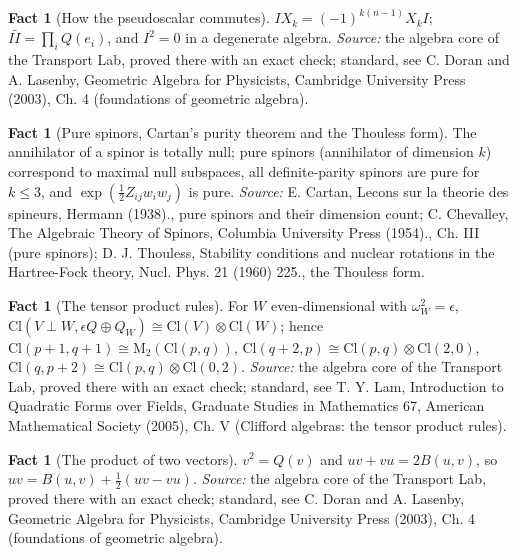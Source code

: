 \documentclass[11pt]{article}
\theoremstyle{definition}
\newtheorem{fact}[theorem]{Fact}
\theoremstyle{plain}
\providecommand{\Cl}{}\renewcommand{\Cl}{\mathrm{Cl}}
\providecommand{\Mat}{}\renewcommand{\Mat}{\mathrm{M}}
\begin{document}
\begin{fact}[How the pseudoscalar commutes]\label{c:std-algebra.pseudoscalar-commutation}
$I X_k = (-1)^{k(n-1)} X_k I$; $I\tilde{I} = \prod_i Q(e_i)$, and $I^{2} = 0$ in a degenerate algebra.
\emph{Source:} the algebra core of the Transport Lab, proved there with an exact check; standard, see C. Doran and A. Lasenby, Geometric Algebra for Physicists, Cambridge University Press (2003), Ch. 4 (foundations of geometric algebra).
\end{fact}

\begin{fact}[Pure spinors, Cartan's purity theorem and the Thouless form]\label{c:std-algebra.pure-spinors}
The annihilator of a spinor is totally null; pure spinors (annihilator of dimension $k$) correspond to maximal null subspaces, all definite-parity spinors are pure for $k \le 3$, and $\exp(\tfrac12 Z_{ij} w_i w_j)$ is pure.
\emph{Source:} E. Cartan, Lecons sur la theorie des spineurs, Hermann (1938)., pure spinors and their dimension count; C. Chevalley, The Algebraic Theory of Spinors, Columbia University Press (1954)., Ch. III (pure spinors); D. J. Thouless, Stability conditions and nuclear rotations in the Hartree-Fock theory, Nucl. Phys. 21 (1960) 225., the Thouless form.
\end{fact}

\begin{fact}[The tensor product rules]\label{c:std-algebra.tensor-rules}
For $W$ even-dimensional with $\omega_W^{2} = \epsilon$, $\Cl(V \perp W, \epsilon Q \oplus Q_W) \cong \Cl(V) \otimes \Cl(W)$; hence $\Cl(p{+}1,q{+}1) \cong \Mat_2(\Cl(p,q))$, $\Cl(q{+}2,p) \cong \Cl(p,q) \otimes \Cl(2,0)$, $\Cl(q,p{+}2) \cong \Cl(p,q) \otimes \Cl(0,2)$.
\emph{Source:} the algebra core of the Transport Lab, proved there with an exact check; standard, see T. Y. Lam, Introduction to Quadratic Forms over Fields, Graduate Studies in Mathematics 67, American Mathematical Society (2005), Ch. V (Clifford algebras: the tensor product rules).
\end{fact}

\begin{fact}[The product of two vectors]\label{c:std-algebra.vector-squares}
$v^{2} = Q(v)$ and $uv + vu = 2B(u, v)$, so $uv = B(u, v) + \tfrac12(uv - vu)$.
\emph{Source:} the algebra core of the Transport Lab, proved there with an exact check; standard, see C. Doran and A. Lasenby, Geometric Algebra for Physicists, Cambridge University Press (2003), Ch. 4 (foundations of geometric algebra).
\end{fact}
\end{document}
